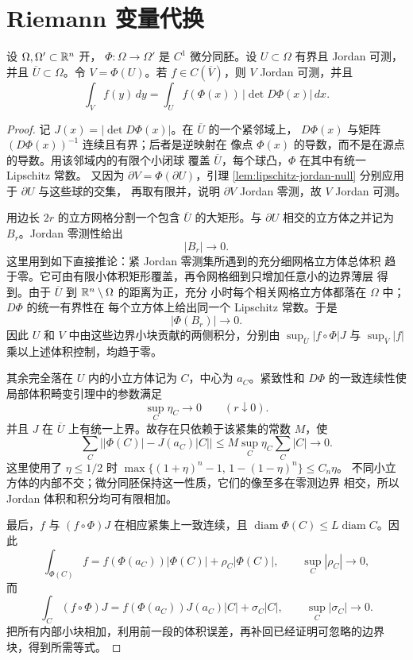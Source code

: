 \section{Riemann 变量代换}

\begin{theorem}
\label{thm:change-variables-riemann-diffeomorphism}
设 \(\Omega,\Omega'\subset\mathbb{R}^n\) 开，
\(\Phi:\Omega\to\Omega'\) 是 \(C^1\) 微分同胚。设 \(U\subset\Omega\)
有界且 Jordan 可测，并且 \(\overline U\subset\Omega\)。令
\(V=\Phi(U)\)。若 \(f\in C(\overline V)\)，则 \(V\) Jordan 可测，并且
\[
 \int_V f(y)\,dy
 =\int_U f(\Phi(x))\,|\det D\Phi(x)|\,dx.
\]
\end{theorem}

\begin{proof}
记 \(J(x)=|\det D\Phi(x)|\)。在 \(\overline U\) 的一个紧邻域上，
\(D\Phi(x)\) 与矩阵 \((D\Phi(x))^{-1}\) 连续且有界；后者是逆映射在
像点 \(\Phi(x)\) 的导数，而不是在源点的导数。用该邻域内的有限个小闭球
覆盖 \(\overline U\)，每个球凸，\(\Phi\) 在其中有统一 Lipschitz 常数。
又因为
\(\partial V=\Phi(\partial U)\)，引理
\ref{lem:lipschitz-jordan-null} 分别应用于 \(\partial U\) 与这些球的交集，
再取有限并，说明 \(\partial V\) Jordan 零测，故
\(V\) Jordan 可测。

用边长 \(2r\) 的立方网格分割一个包含 \(\overline U\) 的大矩形。与
\(\partial U\) 相交的立方体之并记为 \(B_r\)。Jordan 零测性给出
\[
 |B_r|\longrightarrow0.
\]
这里用到如下直接推论：紧 Jordan 零测集所遇到的充分细网格立方体总体积
趋于零。它可由有限小体积矩形覆盖，再令网格细到只增加任意小的边界薄层
得到。由于 \(\overline U\) 到 \(\mathbb{R}^n\setminus\Omega\) 的距离为正，充分
小时每个相关网格立方体都落在 \(\Omega\) 中；\(D\Phi\) 的统一有界性在
每个立方体上给出同一个 Lipschitz 常数。于是
\[
 |\Phi(B_r)|\longrightarrow0.
\]
因此 \(U\) 和 \(V\)
中由这些边界小块贡献的两侧积分，分别由
\(\sup_{\overline U}|f\circ\Phi|J\) 与
\(\sup_{\overline V}|f|\) 乘以上述体积控制，均趋于零。

其余完全落在 \(U\) 内的小立方体记为 \(C\)，中心为 \(a_C\)。紧致性和
\(D\Phi\) 的一致连续性使局部体积畸变引理中的参数满足
\[
 \sup_C\eta_C\longrightarrow0
 \qquad(r\downarrow0).
\]
并且 \(J\) 在 \(\overline U\) 上有统一上界。故存在只依赖于该紧集的常数
\(M\)，使
\[
 \sum_C\bigl||\Phi(C)|-J(a_C)|C|\bigr|
 \le M\sup_C\eta_C\sum_C|C|\longrightarrow0.
\]
这里使用了 \(\eta\le1/2\) 时
\(\max\{(1+\eta)^n-1,\,1-(1-\eta)^n\}\le C_n\eta\)。
不同小立方体的内部不交；微分同胚保持这一性质，它们的像至多在零测边界
相交，所以 Jordan 体积和积分均可有限相加。

最后，\(f\) 与 \((f\circ\Phi)J\) 在相应紧集上一致连续，且
\(\operatorname{diam}\Phi(C)\le L\operatorname{diam}C\)。因此
\[
 \int_{\Phi(C)}f
 =f(\Phi(a_C))|\Phi(C)|+\rho_C|\Phi(C)|,
 \qquad \sup_C|\rho_C|\longrightarrow0,
\]
而
\[
 \int_C(f\circ\Phi)J
 =f(\Phi(a_C))J(a_C)|C|+\sigma_C|C|,
 \qquad \sup_C|\sigma_C|\longrightarrow0.
\]
把所有内部小块相加，利用前一段的体积误差，再补回已经证明可忽略的边界
块，得到所需等式。
\end{proof}

